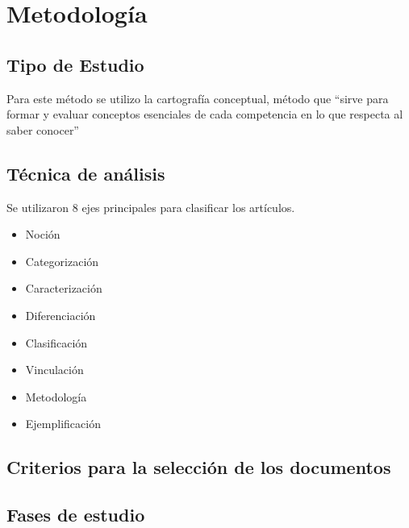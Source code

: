 \section{Metodología}
\subsection{Tipo de Estudio}
Para este método se utilizo la cartografía conceptual, método que “sirve para formar y evaluar conceptos esenciales de cada competencia en lo que respecta al saber conocer” \parencite[][p. 16]{tobon2012} 
\subsection{Técnica de análisis}
Se utilizaron 8 ejes principales para clasificar los artículos.
\begin{itemize}
   \item Noción
   \item Categorización
   \item Caracterización
   \item Diferenciación
   \item Clasificación
   \item Vinculación
   \item Metodología
   \item Ejemplificación
\end{itemize}



\subsection{Criterios para la selección de los documentos}
\subsection{Fases de estudio}

%
%

